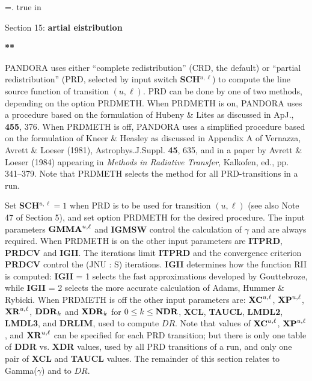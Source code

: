 %
\newtoks\footline \footline={\hss{}.\folio\hss}
%
%
\top
{} true in
\centerline{Section 15: {\bf {}artial 
                         eistribution}}
\blankline
\blankline
\centerline{\bf ***}
\blankline
\blankline
PANDORA uses either ``complete redistribution'' (CRD, the default) or \break
``partial redistribution'' (PRD, selected by input switch {\bf SCH}$^{u, \ell}$)
to compute the line source function of transition $(u,\ell)$. PRD can be done
by one of two methods, depending on the option PRDMETH. When PRDMETH is on,
PANDORA uses a procedure based on the formulation of Hubeny \& Lites as
discussed in ApJ., {\bf 455}, 376. When PRDMETH is off, PANDORA uses a
simplified procedure based on the formulation of Kneer \& Heasley as discussed
in Appendix A of Vernazza, Avrett \& Loeser (1981), Astrophys.J.Suppl.
{\bf 45}, 635, and in a paper by Avrett \& Loeser (1984) appearing in
{\it Methods in Radiative Transfer}, Kalkofen, ed., pp. 341--379. Note that
PRDMETH selects the method for all PRD-transitions in a run.
\blankline
\blankline
\blankline
\centerline{}
\blankline
Set {\bf SCH}$^{u, \ell} = 1$ when PRD is to be used for transition
$(u, \ell)$ (see also Note 47 of Section 5), and set option PRDMETH for the
desired procedure. The input parameters ${\bf GMMA}^{u,\ell}$ and
{\bf IGMSW} control the calculation of $\gamma$ and are always required.
\blankline
When PRDMETH is on the other input parameters are {\bf ITPRD}, {\bf PRDCV}
and {\bf IGII}. The iterations limit {\bf ITPRD} and the convergence
criterion {\bf PRDCV} control the (JNU : S) iterations.
{\bf IGII} determines how the function RII is computed:
{\bf IGII} = 1 selects the fast approximations developed by Gouttebroze, while 
{\bf IGII} = 2 selects the more accurate calculation of Adams, Hummer \& Rybicki.
\ej
When PRDMETH is off the other input parameters are:
${\bf XC}^{u,\ell}$, ${\bf XP}^{u,\ell}$, ${\bf XR}^{u,\ell}$, ${\bf DDR}_k$
and ${\bf XDR}_k$ for $0 \leq k \leq {\bf NDR}$, {\bf XCL}, {\bf TAUCL},
{\bf LMDL2}, {\bf LMDL3}, and {\bf DRLIM}, used to compute $DR$.
Note that values of ${\bf XC}^{u,\ell}$, ${\bf XP}^{u,\ell}$,
and ${\bf XR}^{u,\ell}$ can be specified for each PRD transition;
but there is only one table of {\bf DDR} vs. {\bf XDR} values,
used by all PRD transitions of a run, and only one pair of {\bf XCL} and
{\bf TAUCL} values.
\blankline
The remainder of this section relates to Gamma($\gamma$) and to $DR$.
\blankline
\blankline
\centerline{}
